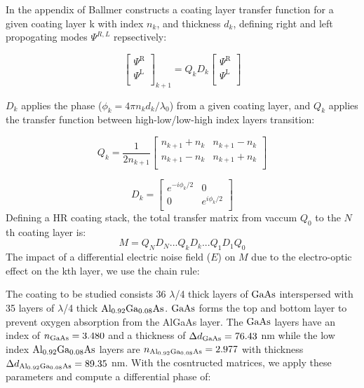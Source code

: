In the appendix of \cite{ballmer2015} Ballmer constructs a coating layer transfer function for a given coating layer k with index $n_k$, and thickness $d_k$, defining right and left propogating modes $\Psi^{R,L}$ repsectively:

\begin{equation}
  \left[ {\begin{array}{c}
   \Psi^\mathrm{R} \\
   \Psi^\mathrm{L} \\
  \end{array} } \right]_{k+1}
  =
%
Q_k D_k
%
 \left[{\begin{array}{c}
   \Psi^\mathrm{R} \\
   \Psi^\mathrm{L} \\
 \end{array}} \right]
\end{equation}

\noindent $D_k$ applies the phase ($\phi_k = 4\pi n_k d_k /\lambda_0$) from a given coating layer, and $Q_k$ applies the transfer function between high-low/low-high index layers transition:

\begin{equation}
Q_k = \frac{1}{2n_{k+1}}
\left[ {\begin{array}{cc}
  n_{k+1} + n_k & n_{k+1} - n_k\\
 n_{k+1} - n_k & n_{k+1} + n_k\\
\end{array} } \right]
\end{equation}

\begin{equation}
D_k =
\left[ {\begin{array}{cc}
  e^{-i \phi_k / 2}& 0\\
 0 & e^{i \phi_k / 2}\\
\end{array} } \right]
\end{equation}
Defining a HR coating stack, the total transfer matrix from vaccum $Q_0$ to the $N$th coating layer is:
\begin{equation}
M = Q_N D_N ...Q_kD_k...Q_1D_1Q_0
\end{equation}
The impact of a differential electric noise field ($E$) on $M$ due to the electro-optic effect on the kth layer, we use the chain rule:


The coating to be studied consists 36 $\lambda$/4  thick layers of $\mathrm{GaAs}$ interspersed with 35 layers of $\lambda$/4 thick $\mathrm{Al_{0.92}Ga_{0.08}As}$.   $\mathrm{GaAs}$ forms the top and bottom layer to prevent oxygen absorption from the AlGaAs layer. The $\mathrm{GaAs}$ layers have an index of $n_{\mathrm{GaAs}} = 3.480$ and a thickness of $\Delta d_{\mathrm{GaAs}} = 76.43$ nm while the low index $\mathrm{Al_{0.92}Ga_{0.08}As}$ layers are $n_{\mathrm{Al_{0.92}Ga_{0.08}As}} = 2.977$ with thickness $\Delta d_{\mathrm{Al_{0.92}Ga_{0.08}As}} = 89.35$ nm. With the cosntructed matrices, we apply these parameters and compute a differential phase of:

